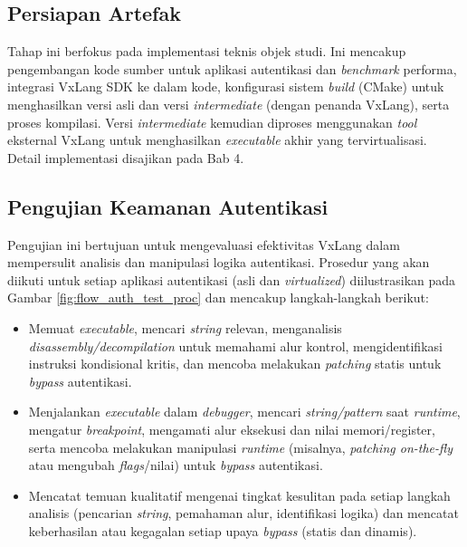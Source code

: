 \subsection{Persiapan Artefak}
Tahap ini berfokus pada implementasi teknis objek studi. Ini mencakup pengembangan kode sumber untuk aplikasi autentikasi dan \textit{benchmark} performa, integrasi VxLang SDK ke dalam kode, konfigurasi sistem \textit{build} (CMake) untuk menghasilkan versi asli dan versi \textit{intermediate} (dengan penanda VxLang), serta proses kompilasi. Versi \textit{intermediate} kemudian diproses menggunakan \textit{tool} eksternal VxLang untuk menghasilkan \textit{executable} akhir yang tervirtualisasi. Detail implementasi disajikan pada Bab 4.

\subsection{Pengujian Keamanan Autentikasi}
Pengujian ini bertujuan untuk mengevaluasi efektivitas VxLang dalam mempersulit analisis dan manipulasi logika autentikasi. Prosedur yang akan diikuti untuk setiap aplikasi autentikasi (asli dan \textit{virtualized}) diilustrasikan pada Gambar \ref{fig:flow_auth_test_proc} dan mencakup langkah-langkah berikut:
\begin{itemize}
    \item {} Memuat \textit{executable}, mencari \textit{string} relevan, menganalisis \textit{disassembly/decompilation} untuk memahami alur kontrol, mengidentifikasi instruksi kondisional kritis, dan mencoba melakukan \textit{patching} statis untuk \textit{bypass} autentikasi.
    \item {} Menjalankan \textit{executable} dalam \textit{debugger}, mencari \textit{string/pattern} saat \textit{runtime}, mengatur \textit{breakpoint}, mengamati alur eksekusi dan nilai memori/register, serta mencoba melakukan manipulasi \textit{runtime} (misalnya, \textit{patching on-the-fly} atau mengubah \textit{flags}/nilai) untuk \textit{bypass} autentikasi.
    \item {} Mencatat temuan kualitatif mengenai tingkat kesulitan pada setiap langkah analisis (pencarian \textit{string}, pemahaman alur, identifikasi logika) dan mencatat keberhasilan atau kegagalan setiap upaya \textit{bypass} (statis dan dinamis).
\end{itemize}

